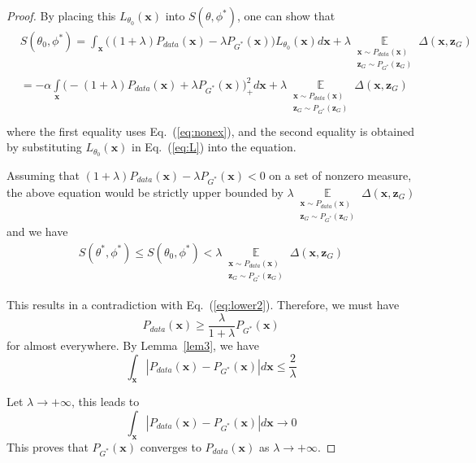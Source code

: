 \begin{proof}
By placing this $L_{\theta_0}(\mathbf x)$ into $S(\theta,\phi^*)$, one can show that
\[
\begin{aligned}
&S(\theta_0,\phi^*)
=\int_\mathbf x \big((1+\lambda)P_{data}(\mathbf x)- \lambda P_{G^*}(\mathbf x)\big)L_{\theta_0}(\mathbf x) d\mathbf x
+\lambda \mathop \mathbb E\limits_{\substack{\mathbf x\sim P_{data}(\mathbf x) \\ \mathbf z_G\sim P_{G^*}(\mathbf z_G)}}\Delta(\mathbf x, \mathbf z_G)\\
&=-\alpha\mathop\int\limits_{\mathbf x} \big(-(1+\lambda)P_{data}(\mathbf x)+\lambda P_{G^*}(\mathbf x)\big)_+^2 d\mathbf x
+\lambda \mathop \mathbb E\limits_{\substack{\mathbf x\sim P_{data}(\mathbf x) \\ \mathbf z_G\sim P_{G^*}(\mathbf z_G)}}\Delta(\mathbf x, \mathbf z_G)\\
\end{aligned}
\]
where the first equality uses Eq.~(\ref{eq:nonex}), and the second equality is obtained by substituting  $L_{\theta_0}(\mathbf x)$ in Eq.~(\ref{eq:L}) into the equation.

Assuming that $(1+\lambda)P_{data}(\mathbf x)- \lambda P_{G^*}(\mathbf x)<0$ on a set of nonzero measure, the above equation would be strictly upper bounded by $\lambda \mathop \mathbb E\limits_{\substack{\mathbf x\sim P_{data}(\mathbf x) \\ \mathbf z_G\sim P_{G^*}(\mathbf z_G)}}\Delta(\mathbf x, \mathbf z_G)$ and we have
\begin{equation}
\begin{aligned}
S(\theta^*,\phi^*)\leq S(\theta_0,\phi^*)<\lambda \mathop \mathbb E\limits_{\substack{\mathbf x\sim P_{data}(\mathbf x) \\ \mathbf z_G\sim P_{G^*}(\mathbf z_G)}}\Delta(\mathbf x, \mathbf z_G)
\end{aligned}
\end{equation}

This results in a contradiction with Eq.~(\ref{eq:lower2}).
Therefore, we must have
\begin{equation}\label{eq:cond}
P_{data}(\mathbf x) \geq \dfrac{\lambda}{1+\lambda}P_{G^*}(\mathbf x)
\end{equation}
for almost everywhere.  By Lemma~\ref{lem3}, we have
$$
\int_{\mathbf x}|P_{data}(\mathbf x)-P_{G^*}(\mathbf x)|d\mathbf x \leq \dfrac{2}{\lambda}
$$

Let $\lambda\rightarrow +\infty$, this leads to
$$
\int_{\mathbf x}|P_{data}(\mathbf x)-P_{G^*}(\mathbf x)|d\mathbf x \rightarrow 0
$$
This proves that $P_{G^*}(\mathbf x)$ converges to $P_{data}(\mathbf x)$ as $\lambda\rightarrow +\infty$.
\end{proof}


